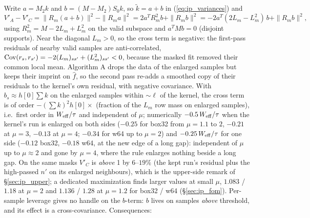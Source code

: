 \documentclass{article}
\numberwithin{equation}{section}   %
\begin{document}
Write $a = M_2k$ and $b = (M - M_2)S_0k$, so $\tilde k = a + b$ in (\ref{eq:ip_variances}) and
\begin{equation}
V'_A - V'_C = \|R_m(a + b)\|^2 - \|R_ma\|^2 = 2a^TR_m^2b + \|R_mb\|^2 = -2a^T(2L_m - L_m^2)\,b + \|R_mb\|^2 ,
\label{eq:ip_bterm}
\end{equation}
using $R_m^2 = M - 2L_m + L_m^2$ on the valid subspace and $a^TMb = 0$ (disjoint supports).  Near the
diagonal $L_m > 0$, so the cross term is negative: the first-pass residuals of nearby valid samples are
anti-correlated, ${\rm Cov}(r_s, r_{s'}) = -2(L_m)_{ss'} + (L_m^2)_{ss'} < 0$, because the masked fit
removed their common local mean.  Algorithm A drops the data of the enlarged samples but keeps their
imprint on $\hat f$, so the second pass re-adds a smoothed copy of their residuals to the kernel's own
residual, with negative covariance.  With $b_s \approx h[0]\sum k$ on the enlarged samples within $\sim\ell$ of
the kernel, the cross term is of order $-(\sum k)^2 h[0] \times$ (fraction of the $L_m$ row mass on enlarged
samples), i.e.\ first order in $W_{\rm eff}/\tau$ and independent of $\mu$; numerically
$-0.5\,W_{\rm eff}/\tau$ when the kernel's run is enlarged on both sides ($-0.25$ for box32 from
$\mu = 1.1$ to $2$, $-0.21$ at $\mu = 3$, $-0.13$ at $\mu = 4$; $-0.34$ for w64 up to $\mu = 2$) and
$-0.25\,W_{\rm eff}/\tau$ for one side ($-0.12$ box32, $-0.18$ w64, at the new edge of a long gap):
independent of $\mu$ up to $\mu \approx 2$ and gone by $\mu = 4$, where the rule enlarges nothing beside a
long gap.  On the same masks $V'_C$ is {\em above} 1 by $6$--$19\%$ (the kept run's residual plus the
high-passed $n'$ on its enlarged neighbours), which is the upper-side remark of \S\ref{sec:ip_upper}; a
dedicated maximization finds larger values at small $\mu$, $1.083$ / $1.18$ at $\mu = 2$ and $1.136$ /
$1.28$ at $\mu = 1.2$ for box32 / w64 (\S\ref{sec:ip_fom}).
Per-sample leverage gives no handle on the $b$-term: $b$ lives on samples {\em above} threshold, and its
effect is a cross-covariance.  Consequences:
\end{document}
